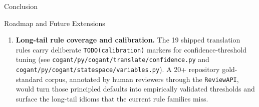 \documentclass[
  ignorenonframetext,
]{beamer}
\begin{document}
\begin{frame}[fragile]{Conclusion}
\begin{block}{Roadmap and Future Extensions}
\begin{enumerate}
\item
  \textbf{Long-tail rule coverage and calibration.} The 19 shipped
  translation rules carry deliberate \texttt{TODO(calibration)} markers
  for confidence-threshold tuning (see
  \texttt{cogant/py/cogant/translate/confidence.py} and
  \texttt{cogant/py/cogant/statespace/variables.py}). A 20+ repository
  gold-standard corpus, annotated by human reviewers through the
  \texttt{ReviewAPI}, would turn those principled defaults into
  empirically validated thresholds and surface the long-tail idioms that
  the current rule families miss.
\end{enumerate}
\end{block}
\end{frame}
\end{document}
